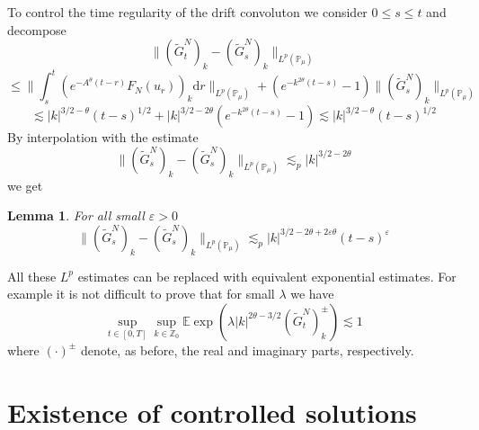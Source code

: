 \documentclass[11pt,a4paper,draft,reqno]{amsart}
\newtheorem{lemma}{Lemma}
\newcommand{\PP}{\mathbb{P}}
\newcommand{\ZZ}{\mathbb{Z}}
\newcommand{\expect}{\mathbb{E}}
\newcommand{\dd}{\mathrm{d}}
\newcommand{\eps}{\varepsilon}
\begin{document}
To control the time regularity of the drift convoluton we consider $0\le s \le t$ and decompose
$$
\|(\tilde G^N_t)_k - (\tilde G^N_s)_k\|_{L^p(\PP_\mu)}
$$
$$
\le \| \int_s^t (e^{-A^\theta(t-r)} F_{N}(u_r))_k \dd  r\|_{L^p(\PP_\mu)} + (e^{-k^{2\theta}(t-s)}-1)\|(\tilde G^N_s)_k\|_{L^p(\PP_\mu)}
$$
$$
\lesssim |k|^{3/2-\theta} (t-s)^{1/2} +|k|^{3/2-2\theta}(e^{-k^{2\theta}(t-s)}-1)
\lesssim |k|^{3/2-\theta} (t-s)^{1/2}
$$
By interpolation with the estimate
$$
\|(\tilde G^N_s)_k - (\tilde G^N_s)_k\|_{L^p(\PP_\mu)} \lesssim_{p} |k|^{3/2-2\theta}
$$
we get 
\begin{lemma}
For all small $\eps > 0$
\begin{equation}
\label{eq:basic-est-4-conv}
\|(\tilde G^N_s)_k - (\tilde G^N_s)_k\|_{L^p(\PP_\mu)} \lesssim_{p} |k|^{3/2-2\theta+2\eps \theta} (t-s)^\eps
\end{equation}
\end{lemma}

All these $L^p$ estimates can be replaced with equivalent exponential estimates. For example it is not difficult to prove that for small $\lambda$ we have
$$
\sup_{t\in[0,T]} \sup_{k\in\ZZ_0} \expect \exp\left(\lambda |k|^{2\theta-3/2} (\tilde G^N_t)^\pm_k \right) \lesssim 1
$$
where $(\cdot)^\pm$ denote, as before, the real and imaginary parts, respectively.

\section{Existence of controlled solutions}
\label{sec:existence}
\end{document}
